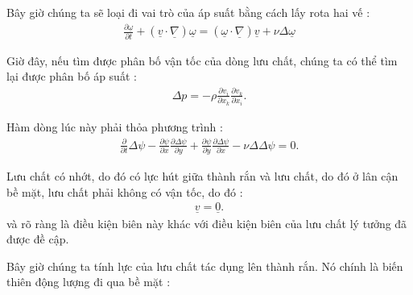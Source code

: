 \documentclass[CO_LUU_CHAT.tex]{subfiles}
\begin{document}
Bây giờ chúng ta sẽ loại đi vai trò của áp suất bằng cách lấy rota hai vế :
\begin{equation}
    \begin{aligned}
        \frac{\partial\underline{\omega}}{\partial t}+\left(\underline{v}\cdot\underline{\nabla}\right)\underline{\omega}=\left(\underline{\omega}\cdot\underline{\nabla}\right)\underline{v}+\nu\Delta\underline{\omega}
    \end{aligned}
\end{equation}

Giờ đây, nếu tìm được phân bố vận tốc của dòng lưu chất, chúng ta có thể tìm lại được phân bố áp suất :
\begin{equation}
    \begin{aligned}
        \Delta p=-\rho\frac{\partial v_i}{\partial x_k}\frac{\partial v_k}{\partial x_i}.
    \end{aligned}
\end{equation}

Hàm dòng lúc này phải thỏa phương trình :
\begin{equation}
    \begin{aligned}
        \frac{\partial}{\partial t}\Delta\psi-\frac{\partial\psi}{\partial x}\frac{\partial\Delta\psi}{\partial y}+\frac{\partial\psi}{\partial y}\frac{\partial\Delta\psi}{\partial x}-\nu\Delta\Delta\psi=0.
    \end{aligned}
\end{equation}

Lưu chất có nhớt, do đó có lực hút giữa thành rắn và lưu chất, do đó ở lân cận bề mặt, lưu chất phải không có vận tốc, do đó :
\begin{equation}
    \begin{aligned}
        \underline{v}=\underline{0}.
    \end{aligned}
\end{equation}
và rõ ràng là điều kiện biên này khác với điều kiện biên của lưu chất lý tưởng đã được đề cập.

Bây giờ chúng ta tính lực của lưu chất tác dụng lên thành rắn. Nó chính là biến thiên động lượng đi qua bề mặt :
\end{document}
